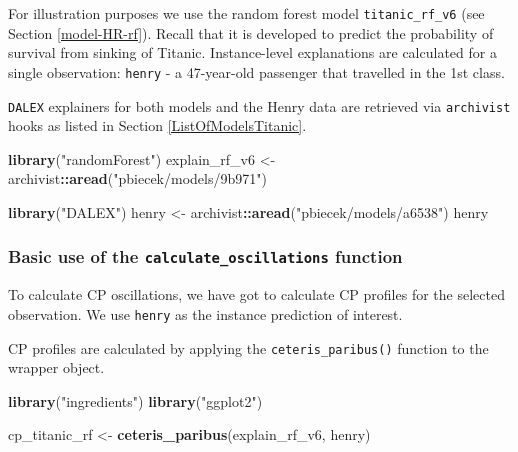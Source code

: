 \documentclass[12pt,]{krantz}
\newenvironment{Shaded}{\begin{snugshade}}{\end{snugshade}}
\newcommand{\KeywordTok}[1]{\textcolor[rgb]{0.13,0.29,0.53}{\textbf{#1}}}
\newcommand{\NormalTok}[1]{#1}
\newcommand{\OperatorTok}[1]{\textcolor[rgb]{0.81,0.36,0.00}{\textbf{#1}}}
\newcommand{\StringTok}[1]{\textcolor[rgb]{0.31,0.60,0.02}{#1}}
\begin{document}
For illustration purposes we use the random forest model \texttt{titanic\_rf\_v6} (see Section \ref{model-HR-rf}). Recall that it is developed to predict the probability of survival from sinking of Titanic. Instance-level explanations are calculated for a single observation: \texttt{henry} - a 47-year-old passenger that travelled in the 1st class.

\texttt{DALEX} explainers for both models and the Henry data are retrieved via \texttt{archivist} hooks as listed in Section \ref{ListOfModelsTitanic}.

\begin{Shaded}
\begin{Highlighting}[]
\KeywordTok{library}\NormalTok{(}\StringTok{"randomForest"}\NormalTok{)}
\NormalTok{explain_rf_v6 <-}\StringTok{ }\NormalTok{archivist}\OperatorTok{::}\KeywordTok{aread}\NormalTok{(}\StringTok{"pbiecek/models/9b971"}\NormalTok{)}

\KeywordTok{library}\NormalTok{(}\StringTok{"DALEX"}\NormalTok{)}
\NormalTok{henry <-}\StringTok{ }\NormalTok{archivist}\OperatorTok{::}\KeywordTok{aread}\NormalTok{(}\StringTok{"pbiecek/models/a6538"}\NormalTok{)}
\NormalTok{henry}
\end{Highlighting}
\end{Shaded}

\hypertarget{basic-use-of-the-calculate_oscillations-function}{%
\subsubsection{\texorpdfstring{Basic use of the \texttt{calculate\_oscillations} function}{Basic use of the calculate\_oscillations function}}\label{basic-use-of-the-calculate_oscillations-function}}

To calculate CP oscillations, we have got to calculate CP profiles for the selected observation. We use \texttt{henry} as the instance prediction of interest.

CP profiles are calculated by applying the \texttt{ceteris\_paribus()} function to the wrapper object.

\begin{Shaded}
\begin{Highlighting}[]
\KeywordTok{library}\NormalTok{(}\StringTok{"ingredients"}\NormalTok{)}
\KeywordTok{library}\NormalTok{(}\StringTok{"ggplot2"}\NormalTok{)}

\NormalTok{cp_titanic_rf <-}\StringTok{ }\KeywordTok{ceteris_paribus}\NormalTok{(explain_rf_v6, henry)}
\end{Highlighting}
\end{Shaded}
\end{document}
